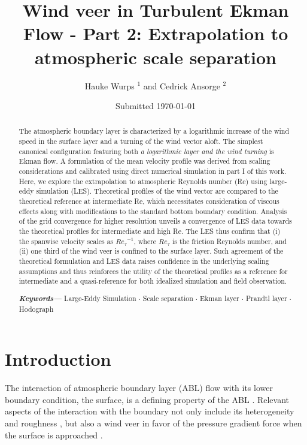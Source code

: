 \documentclass[smallcondensed,final]{svjour3}
\author{Hauke Wurps $^{1}$ and Cedrick Ansorge $^{2}$}
\institute{$^{1}$ Uni Oldenburg \newline 
$^{2}$ FU Berlin, Institut f\"ur Meteorologie, Carl-Heinrich-Becker-Weg 6--10, 12165 Berlin \email{cedrick@posteo.de}}
\date{Submitted \today}
\title{Wind veer in Turbulent Ekman Flow - Part 2: Extrapolation to atmospheric scale separation}
\providecommand{\keywords}[1]
{
  \small	
  \textbf{\textit{Keywords---}} #1
}
\begin{document}
 

\maketitle

\begin{abstract}
  The atmospheric boundary layer is characterized by a logarithmic increase of the wind speed in the surface layer and a turning of the wind vector aloft. The simplest canonical configuration featuring both \emph{a logarithmic layer and the wind turning} is Ekman flow. A formulation of the mean velocity profile was derived from scaling considerations and calibrated using direct numerical simulation in part I of this work. Here, we explore the extrapolation to atmospheric Reynolds number (Re) using large-eddy simulation (LES).
  Theoretical profiles of the wind vector are compared to the theoretical reference at intermediate Re, which necessitates consideration of viscous effects %
  along with modifications to the standard bottom boundary condition.
  Analysis of the grid convergence for higher resolution unveils a convergence of LES data towards the theoretical profiles for intermediate and high Re. The LES thus confirm that (i) the spanwise velocity scales as $\left.Re_\tau\right.^{-1}$, where $Re_\tau$ is the friction Reynolds number, and (ii) one third of the wind veer is confined to the surface layer.
  Such agreement of the theoretical formulation and LES data raises confidence in the underlying scaling assumptions and thus reinforces the utility of the theoretical profiles as a reference for intermediate and a quasi-reference for both idealized simulation and field observation.
%


\keywords{Large-Eddy Simulation $\cdot$ Scale separation $\cdot$ Ekman layer $\cdot$ Prandtl layer $\cdot$ Hodograph}
\end{abstract}
%
%
\section{Introduction}

The interaction of atmospheric boundary layer  (ABL) flow with its lower boundary condition, the surface, is a defining property of the ABL \citep{stull:1988}. Relevant aspects of the interaction with the boundary not only include its heterogeneity \citep{avissar:MWR1989,giorgi:RG1997,claussen:BM1991,garratt:BM1990} and roughness \citep{monin:ARF1970,brutsaert:WRR1975,raupach:AMR1991,kostelecky:JFM2024}, but also a wind veer in favor of the pressure gradient force when the surface is approached \citep{ekman:AMA1905}. 
\end{document}
